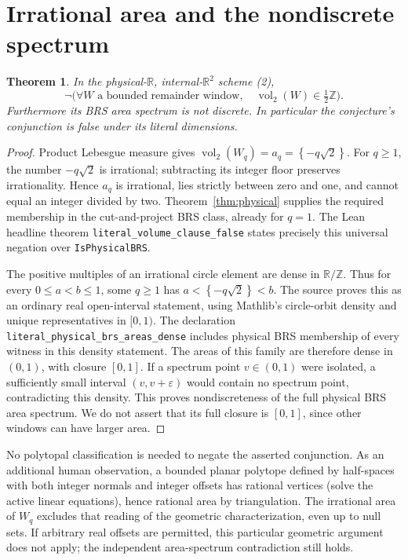 \documentclass[11pt]{article}
\newtheorem{theorem}{Theorem}
\newcommand{\fr}[1]{\left\{#1\right\}}
\newcommand{\R}{\mathbb R}
\newcommand{\Z}{\mathbb Z}
\begin{document}
\section{Irrational area and the nondiscrete spectrum}
\begin{theorem}\label{thm:negation}
In the physical-$\R$, internal-$\R^2$ scheme (2),
\[
 \neg\bigl(\forall W\text{ a bounded remainder window},\quad
                   \operatorname{vol}_2(W)\in\tfrac12\Z\bigr).
\]
Furthermore its BRS area spectrum is not discrete. In particular the
conjecture's conjunction is false under its literal dimensions.
\end{theorem}
\begin{proof}
Product Lebesgue measure gives
$\operatorname{vol}_2(W_q)=a_q=\fr{-q\sqrt2}$.
For $q\ge1$, the number $-q\sqrt2$ is irrational; subtracting its integer
floor preserves irrationality. Hence $a_q$ is irrational, lies strictly
between zero and one, and cannot equal an integer divided by two.
Theorem~\ref{thm:physical} supplies the required membership in the
cut-and-project BRS class, already for $q=1$. The Lean headline theorem
\nolinkurl{literal_volume_clause_false} states precisely this universal
negation over \nolinkurl{IsPhysicalBRS}.

The positive multiples of an irrational circle element are dense in
$\R/\Z$. Thus for every $0\le a<b\le1$, some $q\ge1$ has
$a<\fr{-q\sqrt2}<b$. The source proves this as an ordinary real
open-interval statement, using Mathlib's circle-orbit density and unique
representatives in $[0,1)$. The declaration
\nolinkurl{literal_physical_brs_areas_dense} includes physical BRS
membership of every witness in this density statement. The areas of this family are therefore dense
in $(0,1)$, with closure $[0,1]$. If a spectrum point $v\in(0,1)$
were isolated, a sufficiently small interval $(v,v+\varepsilon)$ would
contain no spectrum point, contradicting this density. This proves
nondiscreteness of the full physical BRS area spectrum. We do not assert
that its full closure is $[0,1]$, since other windows can have larger area.
\end{proof}
No polytopal classification is needed to negate the asserted conjunction.
As an additional human observation, a bounded planar polytope defined
by half-spaces with both integer normals and integer offsets has rational
vertices (solve the active linear equations), hence rational area by
triangulation. The irrational area of $W_q$ excludes that reading of the
geometric characterization, even up to null sets. If arbitrary real
offsets are permitted, this particular geometric argument does not apply;
the independent area-spectrum contradiction still holds.
\end{document}
